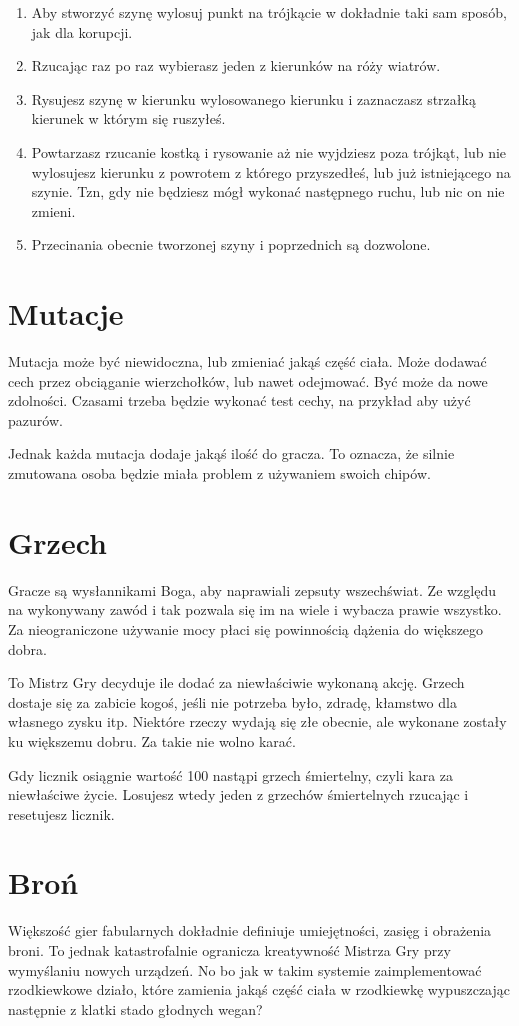 \begin{enumerate}
 \item Aby stworzyć szynę wylosuj punkt na trójkącie w dokładnie taki sam sposób, jak dla korupcji.
 \item Rzucając raz po raz \dvi wybierasz jeden z kierunków na róży wiatrów. 
 \item Rysujesz szynę w kierunku wylosowanego kierunku i zaznaczasz strzałką kierunek w którym się ruszyłeś.
 \item Powtarzasz rzucanie kostką i rysowanie aż nie wyjdziesz poza trójkąt, lub nie wylosujesz kierunku z powrotem z którego przyszedłeś, lub już istniejącego na szynie. Tzn, gdy nie będziesz mógł wykonać następnego ruchu, lub nic on nie zmieni.
 \item Przecinania obecnie tworzonej szyny i poprzednich są dozwolone.
\end{enumerate}

\section{Mutacje}
Mutacja może być niewidoczna, lub zmieniać jakąś część ciała.
Może dodawać cech przez obciąganie wierzchołków, lub nawet odejmować.
Być może da nowe zdolności.
Czasami trzeba będzie wykonać test cechy, na przykład aby użyć pazurów.

Jednak każda mutacja dodaje jakąś ilość \abnkp do gracza.
To oznacza, że silnie zmutowana osoba będzie miała problem z używaniem swoich chipów.

\section{Grzech}
Gracze są wysłannikami Boga, aby naprawiali zepsuty wszechświat.
Ze względu na wykonywany zawód i tak pozwala się im na wiele i wybacza prawie wszystko.
Za nieograniczone używanie mocy płaci się powinnością dążenia do większego dobra.

To Mistrz Gry decyduje ile \abgrz dodać za niewłaściwie wykonaną akcję.
Grzech dostaje się za zabicie kogoś, jeśli nie potrzeba było, zdradę, kłamstwo dla własnego zysku itp.
Niektóre rzeczy wydają się złe obecnie, ale wykonane zostały ku większemu dobru. Za takie nie wolno karać.

Gdy licznik \abgrz osiągnie wartość 100 nastąpi grzech śmiertelny, czyli kara za niewłaściwe życie.
Losujesz wtedy jeden z grzechów śmiertelnych rzucając \dxx i resetujesz licznik.

\section{Broń}
Większość gier fabularnych dokładnie definiuje umiejętności, zasięg i obrażenia broni.
To jednak katastrofalnie ogranicza kreatywność Mistrza Gry przy wymyślaniu nowych urządzeń.
No bo jak w takim systemie zaimplementować rzodkiewkowe działo, które zamienia jakąś część ciała w rzodkiewkę wypuszczając następnie z klatki stado głodnych wegan?

